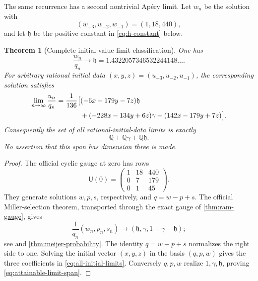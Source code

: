 \documentclass[11pt]{article}
\theoremstyle{keio}
\newtheorem{theorem}{Theorem}[section]
\theoremstyle{definition}
\theoremstyle{remark}
\newcommand{\Q}{\mathbb Q}
\begin{document}
The same recurrence has a second nontrivial Ap\'ery limit.  Let \(w_n\) be
the solution with
\begin{equation}\label{eq:w-initial}
 (w_{-3},w_{-2},w_{-1})=(1,18,440),
\end{equation}
and let \(\mathfrak h\) be the positive constant in
\eqref{eq:h-constant} below.

\begin{theorem}[Complete initial-value limit classification]
\label{thm:ram-full-solution}
One has
\begin{equation}\label{eq:w-limit}
 \boxed{\displaystyle\frac{w_n}{q_n}\longrightarrow\mathfrak h
 =1.4322057346532244148\ldots.}
\end{equation}
For arbitrary rational initial data
\((x,y,z)=(u_{-3},u_{-2},u_{-1})\), the corresponding solution satisfies
\begin{align}
 \lim_{n\to\infty}\frac{u_n}{q_n}
 =\frac1{136}\bigl[&(-6x+179y-7z)\mathfrak h\notag\\
 &+(-228x-134y+6z)\gamma
 +(142x-179y+7z)\bigr].
 \label{eq:all-initial-limits}
\end{align}
Consequently the set of all rational-initial-data limits is exactly
\begin{equation}\label{eq:attainable-limit-span}
 \boxed{\Q+\Q\gamma+\Q\mathfrak h.}
\end{equation}
No assertion that this span has dimension three is made.
\end{theorem}

\begin{proof}
The official cyclic gauge at zero has rows
\begin{equation}\label{eq:U0-rows}
 \mathsf U(0)=
 \begin{pmatrix}1&18&440\\0&7&179\\0&1&45\end{pmatrix}.
\end{equation}
They generate solutions \(w,p,s\), respectively, and
\(q=w-p+s\).  The official Miller-selection theorem, transported through
the exact gauge of \cref{thm:ram-gauge}, gives
\begin{equation}\label{eq:Miller-limit-vector}
 \frac1{q_n}(w_n,p_n,s_n)
 \longrightarrow
 (\mathfrak h,\gamma,1+\gamma-\mathfrak h);
\end{equation}
see \cite[\S5.2]{RamanujanOfficial2026} and
\cref{thm:meijer-probability}.  The identity \(q=w-p+s\) normalizes the
right side to one.  Solving the initial vector
\((x,y,z)\) in the basis \((q,p,w)\) gives the three coefficients in
\eqref{eq:all-initial-limits}.  Conversely \(q,p,w\) realize
\(1,\gamma,\mathfrak h\), proving \eqref{eq:attainable-limit-span}.
\end{proof}
\end{document}
